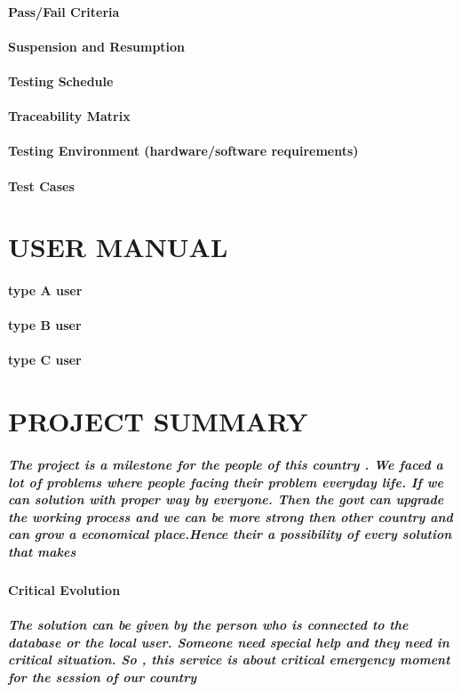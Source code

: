 \documentclass{article}
\begin{document}
\paragraph{Pass/Fail Criteria}
\paragraph{Suspension and Resumption}
\paragraph{Testing Schedule}
\paragraph{Traceability Matrix}
\paragraph{Testing Environment (hardware/software requirements)}
\paragraph{Test Cases}


\newpage
\section{USER MANUAL}
\paragraph{type A user}
\paragraph{type B user}
\paragraph{type C user}

\newpage
\section{PROJECT SUMMARY}
\subparagraph{The project is a milestone for the people of this country . We faced a lot of problems where people facing their problem everyday life. If we can 
solution with proper way by everyone. Then the govt can upgrade the working process and we can be more strong then other country and can grow a economical place.Hence their a possibility of every solution that makes }
\paragraph{Critical Evolution}
\subparagraph{The solution can be given by the person who is connected to the database or the local user. Someone need special help and they need in critical situation. So , this service is about critical emergency moment for the session of our country}
\end{document}
